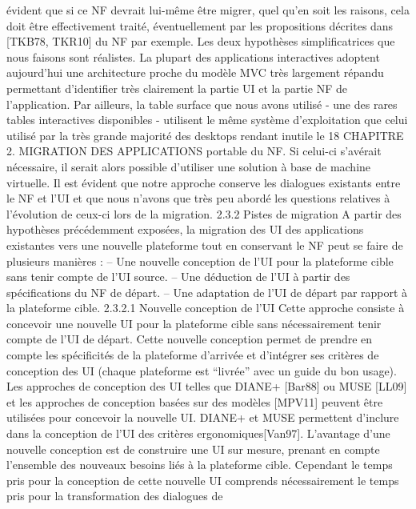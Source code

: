 \documentclass{article}
\begin{document}
\'{e}vident que si ce NF devrait lui-m\^{e}me \^{e}tre migrer, quel qu’en soit les raisons, cela doit \^{e}tre effectivement trait\'{e}, \'{e}ventuellement par les propositions d\'{e}crites dans [TKB78, TKR10] du NF par exemple.
Les deux hypoth\`{e}ses simpliﬁcatrices que nous faisons sont r\'{e}alistes. La plupart des applications
interactives adoptent aujourd’hui une architecture proche du mod\`{e}le MVC tr\`{e}s largement r\'{e}pandu
permettant d’identiﬁer tr\`{e}s clairement la partie UI et la partie NF de l’application. Par ailleurs, la
table surface que nous avons utilis\'{e} - une des rares tables interactives disponibles - utilisent le m\^{e}me
syst\`{e}me d’exploitation que celui utilis\'{e} par la tr\`{e}s grande majorit\'{e} des desktops rendant inutile le
18
CHAPITRE 2. MIGRATION DES APPLICATIONS
portable du NF. Si celui-ci s’av\'{e}rait n\'{e}cessaire, il serait alors possible d’utiliser une solution \`{a} base de
machine virtuelle.
Il est \'{e}vident que notre approche conserve les dialogues existants entre le NF et l’UI et que nous
n’avons que tr\`{e}s peu abord\'{e} les questions relatives \`{a} l’\'{e}volution de ceux-ci lors de la migration.
2.3.2
Pistes de migration
A partir des hypoth\`{e}ses pr\'{e}c\'{e}demment expos\'{e}es, la migration des UI des applications existantes
vers une nouvelle plateforme tout en conservant le NF peut se faire de plusieurs mani\`{e}res :
– Une nouvelle conception de l’UI pour la plateforme cible sans tenir compte de l’UI source.
– Une d\'{e}duction de l’UI \`{a} partir des sp\'{e}ciﬁcations du NF de d\'{e}part.
– Une adaptation de l’UI de d\'{e}part par rapport \`{a} la plateforme cible.
2.3.2.1
Nouvelle conception de l’UI
Cette approche consiste \`{a} concevoir une nouvelle UI pour la plateforme cible sans n\'{e}cessairement
tenir compte de l’UI de d\'{e}part. Cette nouvelle conception permet de prendre en compte les sp\'{e}ciﬁcit\'{e}s
de la plateforme d’arriv\'{e}e et d’int\'{e}grer ses crit\`{e}res de conception des UI (chaque plateforme est “livr\'{e}e” avec un guide du bon usage). Les approches de conception des UI telles que DIANE+ [Bar88]
ou MUSE [LL09] et les approches de conception bas\'{e}es sur des mod\`{e}les [MPV11] peuvent \^{e}tre utilis\'{e}es pour concevoir la nouvelle UI. DIANE+ et MUSE permettent d’inclure dans la conception de
l’UI des crit\`{e}res ergonomiques[Van97].
L’avantage d’une nouvelle conception est de construire une UI sur mesure, prenant en compte
l’ensemble des nouveaux besoins li\'{e}s \`{a} la plateforme cible. Cependant le temps pris pour la conception
de cette nouvelle UI comprends n\'{e}cessairement le temps pris pour la transformation des dialogues de
\end{document}
